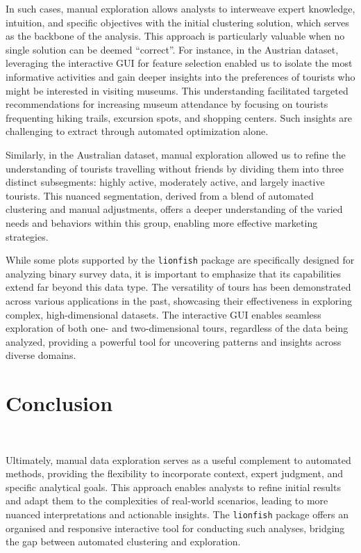 \documentclass[article]{ajs}
\begin{document}
In such cases, manual exploration allows analysts to interweave expert knowledge, intuition, and specific objectives with the initial clustering solution, which serves as the backbone of the analysis. This approach is particularly valuable when no single solution can be deemed “correct''. For instance, in the Austrian dataset, leveraging the interactive GUI for feature selection enabled us to isolate the most informative activities and gain deeper insights into the preferences of tourists who might be interested in visiting museums. This understanding facilitated targeted recommendations for increasing museum attendance by focusing on tourists frequenting hiking trails, excursion spots, and shopping centers. Such insights are challenging to extract through automated optimization alone.

Similarly, in the Australian dataset, manual exploration allowed us to refine the understanding of tourists travelling without friends by dividing them into three distinct subsegments: highly active, moderately active, and largely inactive tourists. This nuanced segmentation, derived from a blend of automated clustering and manual adjustments, offers a deeper understanding of the varied needs and behaviors within this group, enabling more effective marketing strategies.

While some plots supported by the \texttt{lionfish} package are specifically designed for analyzing binary survey data, it is important to emphasize that its capabilities extend far beyond this data type. The versatility of tours has been demonstrated across various applications in the past, showcasing their effectiveness in exploring complex, high-dimensional datasets. The interactive GUI enables seamless exploration of both one- and two-dimensional tours, regardless of the data being analyzed, providing a powerful tool for uncovering patterns and insights across diverse domains.


\section{Conclusion}~\label{conclusion}

Ultimately, manual data exploration serves as a useful complement to automated methods, providing the flexibility to incorporate context, expert judgment, and specific analytical goals. This approach enables analysts to refine initial results and adapt them to the complexities of real-world scenarios, leading to more nuanced interpretations and actionable insights. The \texttt{lionfish} package offers an organised and responsive interactive tool for conducting such analyses, bridging the gap between automated clustering and exploration.
\end{document}
